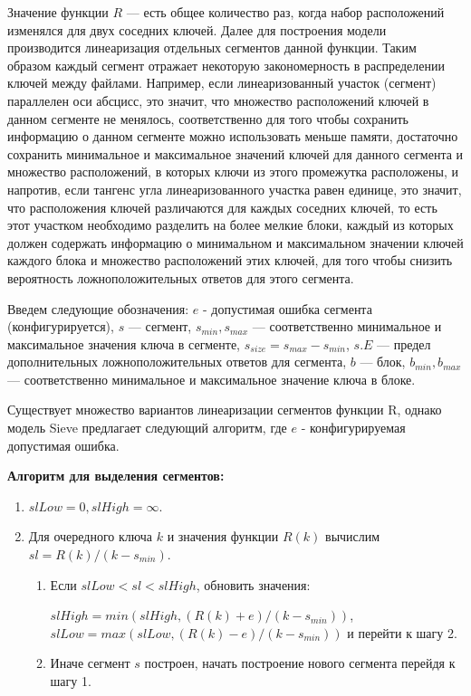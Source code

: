Значение функции $R$ --- есть общее количество раз, когда набор расположений изменялся для двух соседних ключей.
Далее для построения модели производится линеаризация отдельных сегментов данной функции.
Таким образом каждый сегмент отражает некоторую закономерность в распределении ключей между файлами.
Например, если линеаризованный участок (сегмент) параллелен оси абсцисс, это значит, что множество расположений ключей в данном сегменте не менялось, соответственно для того чтобы сохранить информацию о данном сегменте можно использовать меньше памяти, достаточно сохранить минимальное и максимальное значений ключей для данного сегмента и множество расположений, в которых ключи из этого промежутка расположены, и напротив, если тангенс угла линеаризованного участка равен единице, это значит, что расположения ключей различаются для каждых соседних ключей, то есть этот участком необходимо разделить на более мелкие блоки, каждый из которых должен содержать информацию о минимальном и максимальном значении ключей каждого блока и множество расположений этих ключей, для того чтобы снизить вероятность ложноположительных ответов для этого сегмента.

Введем следующие обозначения:
$e$ - допустимая ошибка сегмента (конфигурируется), $s$ --- сегмент, $s_{min}, s_{max}$ --- соответственно минимальное и максимальное значения ключа в сегменте, $s_{size} = s_{max} - s_{min}$, $s.E$ --- предел дополнительных ложноположительных ответов для сегмента, $b$ --- блок, $b_{min}, b_{max}$ --- соответственно минимальное и максимальное значение ключа в блоке.

Существует множество вариантов линеаризации сегментов функции R, однако модель Sieve \cite{Sieve} предлагает следующий алгоритм, где $e$ - конфигурируемая допустимая ошибка.

\textbf{Алгоритм для выделения сегментов:}
\begin{enumerate}
\item $slLow = 0, slHigh = \infty$.
\item Для очередного ключа $k$ и значения функции $R(k)$ вычислим \mbox{$sl = R(k) / (k - s_{min})$}.
    \begin{enumerate}
    \item Если \mbox{$slLow < sl < slHigh$}, обновить значения:
    
    \mbox{$slHigh = min(slHigh, (R(k) + e) / (k - s_{min}))$}, \mbox{$slLow = max(slLow, (R(k) - e) / (k - s_{min}))$} и перейти к шагу 2.
    \item Иначе сегмент $s$ построен, начать построение нового сегмента перейдя к шагу 1.
    \end{enumerate}
\end{enumerate}

